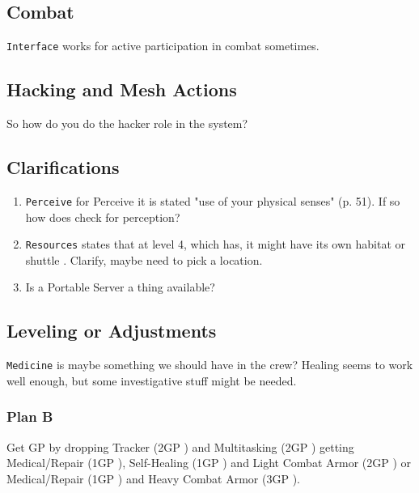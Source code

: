 \subsection{Combat}

\texttt{Interface} works for active participation in combat sometimes.  \citep[p. 50]{ep2e_1.1_2019}


\subsection{Hacking and Mesh Actions}

So how do you do the hacker role in the system?


\subsection{Clarifications}

\begin{enumerate}
    \item \texttt{Perceive}  for Perceive it is stated "use of your physical senses" (p. 51). If so how does \egr{} check for perception?

    \item \texttt{Resources} states that at level 4, which \egr{} has, it might have its own habitat or shuttle \citep[p. 75]{ep2e_1.1_2019}. Clarify, maybe need to pick a location.

    \item Is a Portable Server a thing available?
\end{enumerate}

\subsection{Leveling or Adjustments}

\texttt{Medicine} is maybe something we should have in the crew? Healing seems to work well enough, but some investigative stuff might be needed.

\subsubsection{Plan B}

Get GP by dropping Tracker (2GP \citep[p. 326]{ep2e_1.1_2019}) and Multitasking (2GP \citep[p. 320]{ep2e_1.1_2019}) getting Medical/Repair (1GP \citep[p. 217]{ep2e_1.1_2019}), Self-Healing (1GP \citep[p. 217]{ep2e_1.1_2019}) and Light Combat Armor (2GP \citep[p. 215]{ep2e_1.1_2019}) or Medical/Repair (1GP \citep[p. 217]{ep2e_1.1_2019}) and Heavy Combat Armor (3GP \citep[p. 215]{ep2e_1.1_2019}).

